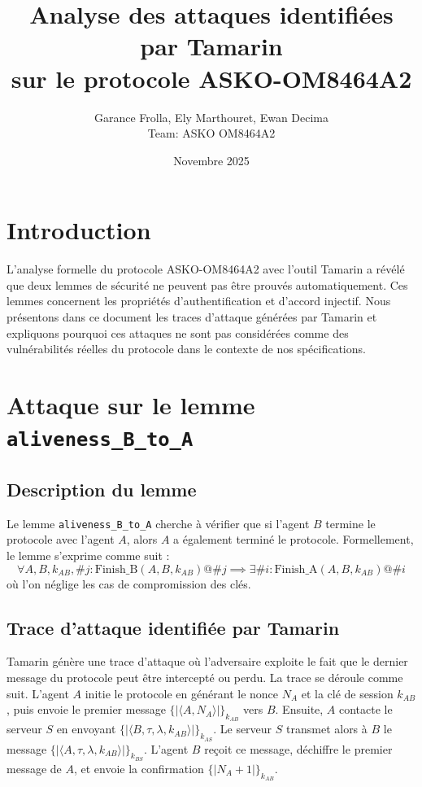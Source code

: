 \documentclass[11pt]{article}
\title{Analyse des attaques identifiées par Tamarin\\sur le protocole ASKO-OM8464A2}
\author{Garance Frolla, Ely Marthouret, Ewan Decima\\Team: ASKO OM8464A2}
\date{Novembre 2025}
\begin{document}
\maketitle

\section{Introduction}

L'analyse formelle du protocole ASKO-OM8464A2 avec l'outil Tamarin a révélé que deux lemmes de 
sécurité ne peuvent pas être prouvés automatiquement. Ces lemmes concernent les propriétés 
d'authentification et d'accord injectif. Nous présentons dans ce document les traces d'attaque 
générées par Tamarin et expliquons pourquoi ces attaques ne sont pas considérées comme des 
vulnérabilités réelles du protocole dans le contexte de nos spécifications.

\section{Attaque sur le lemme \texttt{aliveness\_B\_to\_A}}

\subsection{Description du lemme}

Le lemme \texttt{aliveness\_B\_to\_A} cherche à vérifier que si l'agent $B$ termine le protocole 
avec l'agent $A$, alors $A$ a également terminé le protocole. Formellement, le lemme s'exprime 
comme suit :    
\[
\forall A, B, k_{AB}, \#j : \text{Finish\_B}(A, B, k_{AB}) @ \#j \implies 
\exists \#i : \text{Finish\_A}(A, B, k_{AB}) @ \#i
\]
où l'on néglige les cas de compromission des clés.

\subsection{Trace d'attaque identifiée par Tamarin}

Tamarin génère une trace d'attaque où l'adversaire exploite le fait que le dernier message du 
protocole peut être intercepté ou perdu. La trace se déroule comme suit. L'agent $A$ initie le 
protocole en générant le nonce $N_A$ et la clé de session $k_{AB}$, puis envoie le premier 
message $\{|\langle A, N_A \rangle|\}_{k_{AB}}$ vers $B$. Ensuite, $A$ contacte le serveur $S$ 
en envoyant $\{|\langle B, \tau, \lambda, k_{AB} \rangle|\}_{k_{AS}}$. Le serveur $S$ transmet 
alors à $B$ le message $\{|\langle A, \tau, \lambda, k_{AB} \rangle|\}_{k_{BS}}$. L'agent $B$ 
reçoit ce message, déchiffre le premier message de $A$, et envoie la confirmation 
$\{|N_A + 1|\}_{k_{AB}}$.
\end{document}

